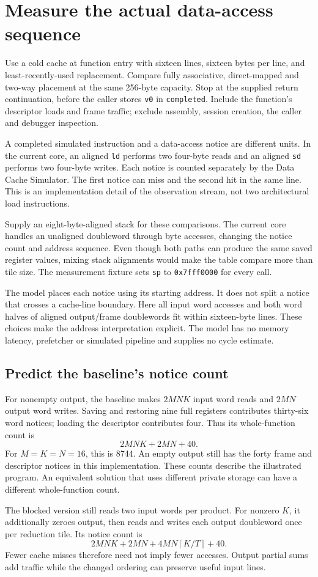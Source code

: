 \section{Measure the actual data-access sequence}
Use a cold cache at function entry with sixteen lines, sixteen bytes per line,
and least-recently-used replacement. Compare fully associative, direct-mapped and
two-way placement at the same 256-byte capacity. Stop at the supplied return
continuation, before the caller stores \texttt{v0} in \texttt{completed}. Include
the function's descriptor loads and frame traffic; exclude assembly, session
creation, the caller and debugger inspection.

A completed simulated instruction and a data-access notice are different units.
In the current core, an aligned \texttt{ld} performs two four-byte reads and an
aligned \texttt{sd} performs two four-byte writes. Each notice is counted separately
by the Data Cache Simulator. The first notice can miss and the second hit in the
same line. This is an implementation detail of the observation stream, not two
architectural load instructions.

Supply an eight-byte-aligned stack for these comparisons. The current core handles
an unaligned doubleword through byte accesses, changing the notice count and address
sequence. Even though both paths can produce the same saved register values, mixing
stack alignments would make the table compare more than tile size. The measurement
fixture sets \texttt{sp} to \texttt{0x7fff0000} for every call.

The model places each notice using its starting address. It does not split a
notice that crosses a cache-line boundary. Here all input word accesses and both
word halves of aligned output/frame doublewords fit within sixteen-byte lines.
These choices make the address interpretation explicit. The model has no memory
latency, prefetcher or simulated pipeline and supplies no cycle estimate.

\subsection{Predict the baseline's notice count}
For nonempty output, the baseline makes \(2MNK\) input word reads and \(2MN\)
output word writes. Saving and restoring nine full registers contributes thirty-six
word notices; loading the descriptor contributes four. Thus its whole-function
count is
\[
  2MNK+2MN+40.
\]
For \(M=K=N=16\), this is 8744. An empty output still has the forty frame and
descriptor notices in this implementation. These counts describe the illustrated
program. An equivalent solution that uses different private storage can have a
different whole-function count.

The blocked version still reads two input words per product. For nonzero \(K\),
it additionally zeroes output, then reads and writes each output doubleword once
per reduction tile. Its notice count is
\[
  2MNK+2MN+4MN\left\lceil K/T\right\rceil+40.
\]
Fewer cache misses therefore need not imply fewer accesses. Output partial sums
add traffic while the changed ordering can preserve useful input lines.
